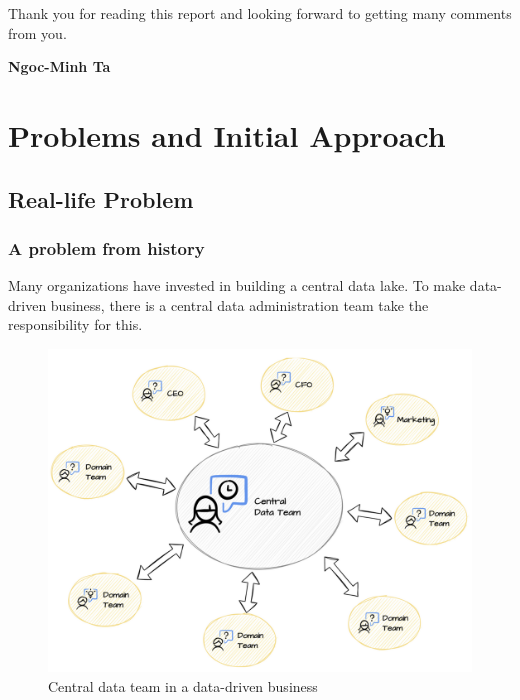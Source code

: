 \documentclass[12pt, a4paper]{book}
\begin{document}
Thank you for reading this report and looking forward to getting many comments from you.\\
\vspace{0.5cm}

\raggedleft
\textbf{Ngoc-Minh Ta}

\justifying
{}

        \tableofcontents
        \listoffigures
        \begingroup
        \let\clearpage\relax
        \listoftables
        \endgroup
        
    \endgroup
    
    \begingroup
        \frontmatter
        \justifying
        \let\cleardoublepage\clearpage
    \endgroup
    
    \mainmatter
    \justifying
    \normalsize
\chapter{Problems and Initial Approach}

\section{Real-life Problem}
\subsection{A problem from history}
Many organizations have invested in building a central data lake. To make data-driven business, there is a central data administration team take the responsibility for this.

\begin{figure}[h]
	\centering
	\includegraphics[width=14cm]{CentralDataTeam.png}
	\caption{Central data team in a data-driven business}
	\label{centraldata}
\end{figure}
\end{document}
